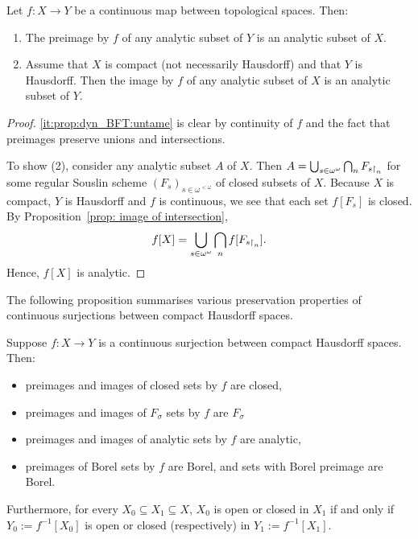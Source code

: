	\begin{prop}\label{prop: preservation of analyticity by images and preimages}
		Let $f\colon X \to Y$ be a continuous map between topological spaces. Then:
		\begin{enumerate}
			\item The preimage by $f$ of any analytic subset of $Y$ is an analytic subset of $X$.
			\item Assume that $X$ is compact (not necessarily Hausdorff) and that $Y$ is Hausdorff. Then the image by $f$ of any analytic subset of $X$ is an analytic subset of $Y$.
		\end{enumerate}
	\end{prop}
	\begin{proof}
		\ref{it:prop:dyn_BFT:untame} is clear by continuity of $f$ and the fact that preimages preserve unions and intersections.
		
		To show (2), consider any analytic subset $A$ of $X$. Then $A=\bigcup_{s \in \omega^\omega} \bigcap_n F_{s\mathord{\upharpoonright}_n}$ for some regular Souslin scheme $(F_s)_{s \in \omega^{<\omega}}$ of closed subsets of $X$. Because $X$ is compact, $Y$ is Hausdorff and $f$ is continuous, we see that each set $f[F_s]$ is closed. By Proposition~\ref{prop: image of intersection},
		\[
			f[X] = \bigcup_{s \in \omega^\omega} \bigcap_n f[F_{s\mathord{\upharpoonright}_n}].
		\]
		Hence, $f[X]$ is analytic.
	\end{proof}
	The following proposition summarises various preservation properties of continuous surjections between compact Hausdorff spaces.
	\begin{prop}
		\label{prop:preservation_properties}
		Suppose $f\colon X\to Y$ is a continuous surjection between compact Hausdorff spaces. Then:
		\begin{itemize}
			\item
			preimages and images of closed sets by $f$ are closed,
			\item
			preimages and images of $F_\sigma$ sets by $f$ are $F_\sigma$
			\item
			preimages and images of analytic sets by $f$ are analytic,
			\item
			preimages of Borel sets by $f$ are Borel, and sets with Borel preimage are Borel.
		\end{itemize}
		
		Furthermore, for every $X_0\subseteq X_1\subseteq X$, $X_0$ is open or closed in $X_1$ if and only if $Y_0:=f^{-1}[X_0]$ is open or closed (respectively) in $Y_1:=f^{-1}[X_1]$.
	\end{prop}
